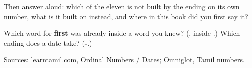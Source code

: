 Then answer aloud: which of the eleven is not built by the ending on its own number, what is it built on instead, and where in this book did you first say it?

\begin{tcolorbox}[breakable,colback=teal!4,colframe=teal!35!black,title={Before you move on}]
Which word for \textbf{first} was already inside a word you knew? (\textbf{}, inside \textbf{}.) Which ending does a date take? (\textbf{-}.)

Sources: \href{https://www.learntamil.com/part1/ch02/ordinal-numbers-dates/}{learntamil.com, Ordinal Numbers / Dates}; \href{https://www.omniglot.com/language/numbers/tamil.htm}{Omniglot, Tamil numbers}.
\end{tcolorbox}
